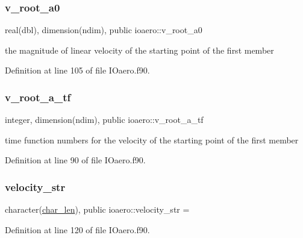 \mbox{\label{namespaceioaero_a3cefdbd9d62bffe41f44b7f79f321f67}} 
\subsubsection{\texorpdfstring{v\+\_\+root\+\_\+a0}{v\_root\_a0}}
{\footnotesize\ttfamily real(dbl), dimension(ndim), public ioaero\+::v\+\_\+root\+\_\+a0}



the magnitude of linear velocity of the starting point of the first member 



Definition at line 105 of file I\+Oaero.\+f90.

\mbox{\label{namespaceioaero_adb4e11942a388b1bf1f13d10c79614bc}} 
\subsubsection{\texorpdfstring{v\+\_\+root\+\_\+a\+\_\+tf}{v\_root\_a\_tf}}
{\footnotesize\ttfamily integer, dimension(ndim), public ioaero\+::v\+\_\+root\+\_\+a\+\_\+tf}



time function numbers for the velocity of the starting point of the first member 



Definition at line 90 of file I\+Oaero.\+f90.

\mbox{\label{namespaceioaero_ac653c5aea8d1de1b6255d0f47b6722f6}} 
\subsubsection{\texorpdfstring{velocity\+\_\+str}{velocity\_str}}
{\footnotesize\ttfamily character(\hyperlink{namespaceioaero_acd6bdfdcfd986fd1c26261e5996e3b03}{char\+\_\+len}), public ioaero\+::velocity\+\_\+str = \textquotesingle{}\textquotesingle{}}



Definition at line 120 of file I\+Oaero.\+f90.

